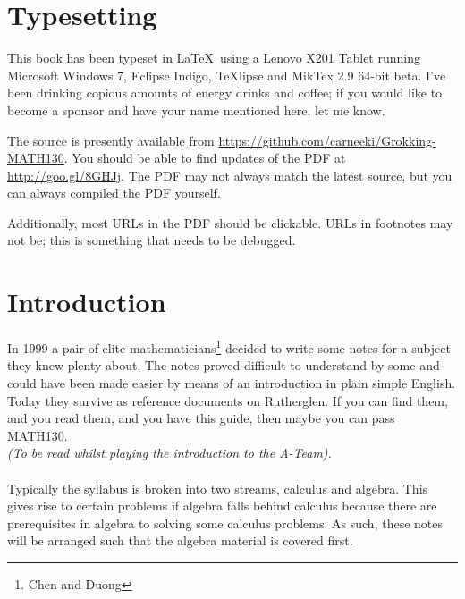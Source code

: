 \section{Typesetting}
This book has been typeset in \LaTeX~using a Lenovo X201 Tablet running
Microsoft Windows 7, Eclipse Indigo, TeXlipse and MikTex 2.9 64-bit beta. I've
been drinking copious amounts of energy drinks and coffee; if you would like to
become a sponsor and have your name mentioned here, let me know.

The source is presently available from
\url{https://github.com/carneeki/Grokking-MATH130}. You should be able to find
updates of the PDF at \url{http://goo.gl/8GHJj}. The PDF may not always match
the latest source, but you can always compiled the PDF yourself.

Additionally, most URLs in the PDF should be clickable. URLs in footnotes may
not be; this is something that needs to be debugged.

\section{Introduction}
\label{sec:Introduction}
In 1999 a pair of elite mathematicians\footnote{Chen and Duong} decided to
write some notes for a subject they knew plenty about. The notes proved
difficult to understand by some and could have been made easier by means of an
introduction in plain simple English. Today they survive as reference documents
on Rutherglen. If you can find them, and you read them, and you have this
guide, then maybe you can pass MATH130.\\
\emph{(To be read whilst playing the introduction to the A-Team).}\\
\\
Typically the syllabus is broken into two streams, calculus and algebra. This
gives rise to certain problems if algebra falls behind calculus because
there are prerequisites in algebra to solving some calculus problems. As such,
these notes will be arranged such that the algebra material is covered first.